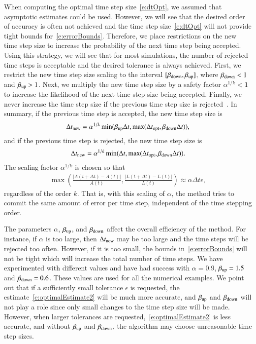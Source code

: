 When computing the optimal time step size~\eqref{e:dtOpt}, we assumed
that asymptotic estimates could be used.  However, we will see that the
desired order of accuracy is often not achieved and the time step
size~\eqref{e:dtOpt} will not provide tight bounds
for~\eqref{e:errorBounds}.  Therefore, we place restrictions on the new
time step size to increase the probability of the next time step being
accepted.  Using this strategy, we will see that for most simulations,
the number of rejected time steps is acceptable and the desired
tolerance is always achieved.  First, we restrict the new time step
size scaling to the interval $[\beta_{{\mathrm{down}}},\beta_{{\mathrm{up}}}]$, where
$\beta_{{\mathrm{down}}} < 1$ and $\beta_{{\mathrm{up}}} > 1$.  Next, we multiply the new
time step size by a safety factor $\alpha^{1/k}<1$ to increase the
likelihood of the next time step size being accepted.  Finally, we
never increase the time step size if the previous time step size is
rejected~\cite{hai:nor:wan1993}.  In summary, if the previous time step
is accepted, the new time step size is
\begin{align*}
  \Delta t_{{\mathrm{new}}} = \alpha^{1/k}\min(\beta_{{\mathrm{up}}}\Delta t,
    \max(\Delta t_{{\mathrm{opt}}},\beta_{{\mathrm{down}}}\Delta t)),
\end{align*}
and if the previous time step is rejected, the new time step size is
\begin{align*}
  \Delta t_{{\mathrm{new}}} = \alpha^{1/k}\min(\Delta t,
    \max(\Delta t_{{\mathrm{opt}}},\beta_{{\mathrm{down}}}\Delta t)).
\end{align*}
The scaling factor $\alpha^{1/k}$ is chosen so that
\begin{align*}
  \max\left(\frac{|A(t+\Delta t)-A(t)|}{A(t)},
            \frac{|L(t+\Delta t)-L(t)|}{L(t)}\right)
  \approx \alpha \Delta t \epsilon,
\end{align*}
regardless of the order $k$.  That is, with this scaling of $\alpha$,
the method tries to commit the same amount of error per time step,
independent of the time stepping order.

The parameters $\alpha$, $\beta_{{\mathrm{up}}}$, and $\beta_{{\mathrm{down}}}$  affect the
overall efficiency of the method.  For instance, if $\alpha$ is too
large, then $\Delta t_{{\mathrm{new}}}$ may be too large and the time steps will
be rejected too often.  However, if it is too small, the bounds
in~\eqref{e:errorBounds} will not be tight which will increase the
total number of time steps.  We have experimented with different values
and have had success with $\alpha = 0.9$, $\beta_{{\mathrm{up}}} = 1.5$ and
$\beta_{{\mathrm{down}}} = 0.6$.  These values are used for all the numerical
examples.  We point out that if a sufficiently small tolerance
$\epsilon$ is requested, the estimate~\eqref{e:optimalEstimate2} will
be much more accurate, and $\beta_{{\mathrm{up}}}$ and $\beta_{{\mathrm{down}}}$ will not
play a role since only small changes to the time step size will be
made.  However, when larger tolerances are
requested,~\eqref{e:optimalEstimate2} is less accurate, and without
$\beta_{{\mathrm{up}}}$ and $\beta_{{\mathrm{down}}}$, the algorithm may choose
unreasonable time step sizes.

